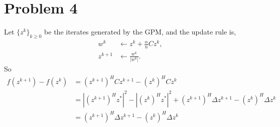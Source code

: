 \clearpage
\section{Problem 4}

Let $\{z^k\}_{k\ge0}$ be the iterates generated by the GPM,
and the update rule is,
\begin{equation}
\begin{split}
    w^k &\leftarrow z^k+\frac{\alpha}{n}Cz^k, \\
    z^{k+1} &\leftarrow \frac{w^k}{|w^k|}.
\end{split}
\end{equation}
So
\begin{equation}
\begin{split}
    f(z^{k+1})-f(z^k)
    &= (z^{k+1})^HCz^{k+1} - (z^k)^HCz^k \\
    &= |(z^{k+1})^Hz^*|^2 - |(z^k)^Hz^*|^2 +
        (z^{k+1})^H\Delta z^{k+1} - (z^k)^H\Delta z^k \\
    &= (z^{k+1})^H\Delta z^{k+1} - (z^k)^H\Delta z^k \\
\end{split}
\end{equation}
